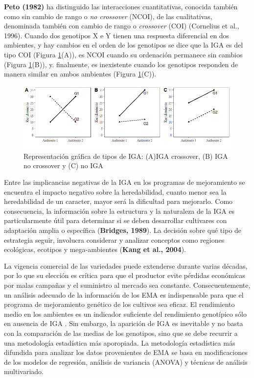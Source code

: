 \textbf{Peto (1982)} ha distinguido las interacciones cuantitativas, conocida también como sin cambio de rango o \emph{no crossover} (NCOI), de las cualitativas, denominada también con
cambio de rango o \emph{crossover} (COI) (Cornelius et al., 1996). Cuando dos genotipos X e Y tienen una respuesta diferencial en dos ambientes, y hay cambios en el orden de los genotipos se dice que la IGA es del tipo COI (Figura \ref{fig:fig11}(A)), es NCOI cuando su ordenación permanece sin cambios (Figura  \ref{fig:fig11}(B)), y. finalmente, es inexistente cuando los genotipos responden de manera similar en ambos ambientes (Figura \ref{fig:fig11}(C)). 


\begin{figure}[h]
\begin{center}
\includegraphics[width=14cm]{./Graficos/interac}
\end{center}
\caption{Representación gráfica de tipos de IGA: (A)IGA crossover, (B) IGA no crossover y (C) no IGA}
\label{fig:fig11}
\end{figure}


Entre las implicancias negativas de la IGA en los programas de mejoramiento se encuentra el impacto negativo sobre la heredabilidad, cuanto menor sea la heredabilidad de un caracter, mayor será la dificultad para mejorarlo. Como consecuencia, la información sobre la estructura y la naturaleza de la IGA es particularmente útil para determinar si se deben desarrollar cultivares con adaptación amplia o específica (\textbf{Bridges, 1989}). La decisión sobre qué tipo de estrategia seguir, involucra considerar y analizar  conceptos como regiones ecológicas, ecotipos y mega-ambientes (\textbf{Kang et al., 2004}).


La vigencia comercial de las variedades puede extenderse durante varias décadas, por lo que su elección es crítica para que el productor evite pérdidas económicas por malas campañas y el suministro al mercado sea constante. Consecuentemente, un análisis adecuado de la información de los EMA es indispensable para que el programa de mejoramiento genético de los cultivos sea eficaz. El rendimiento medio en los ambientes es un indicador suficiente del rendimiento genotípico sólo en ausencia de IGA \citep{YanKang2003}. Sin embargo, la aparición de IGA es inevitable y no basta con la comparación de las medias de los genotipos, sino que se debe recurrir a una metodología estadística más aporopiada. La metodología estadística más difundida para analizar los datos provenientes de EMA se basa en modificaciones de los modelos de regresión, análisis de variancia (ANOVA) y técnicas de análisis multivariado. 

